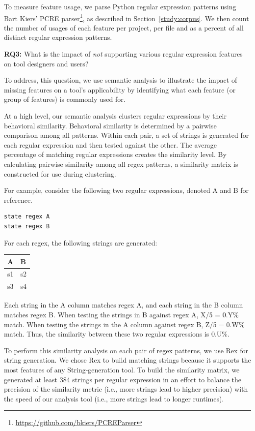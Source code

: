 To measure feature usage, we parse Python regular expression patterns using Bart Kiers' PCRE parser\footnote{\url{https://github.com/bkiers/PCREParser}}, as described in Section~\ref{study:corpus}.  We then count the number of usages of each feature per project, per file and as a percent of all distinct regular expression patterns.

\textbf{RQ3:} What is the impact of \emph{not} supporting various regular expression features on tool designers and users?

To address, this question, we use semantic analysis to illustrate the impact of missing features on a tool's applicability by identifying what each feature (or group of features) is commonly used for.

At a high level, our semantic analysis clusters regular expressions by their behavioral similarity. Behavioral similarity is determined by a pairwise comparison among all patterns. Within each pair, a set of strings is generated for each regular expression and then tested against the other. The average percentage of matching regular expressions creates the similarity level. By calculating pairwise similarity among all regex patterns, a similarity matrix is constructed for use during clustering.

For example, consider the following two regular expressions, denoted A and B for reference.

\begin{verbatim}
state regex A
state regex B
\end{verbatim}

For each regex, the following strings are generated:

\begin{tabular}{l | l}
A & B \\ \hline
s1 & s2 \\
s3 & s4 \\
\end{tabular}

Each string in the A column matches regex A, and each string in the B column matches regex B. When testing the strings in B against regex A, X/5 = 0.Y\% match. When testing the strings in the A column against regex B, Z/5 = 0.W\% match. Thus, the similarity between these two regular expressions is 0.U\%.

To perform this similarity analysis on each pair of regex patterns, we use Rex for string generation.  We chose Rex to build matching strings because it supports the most features of any String-generation tool. To build the similarity matrix, we generated at least 384 strings per regular expression in an effort to balance the precision of the similarity metric (i.e., more strings lead to higher precision) with the speed of our analysis tool (i.e., more strings lead to longer runtimes).

